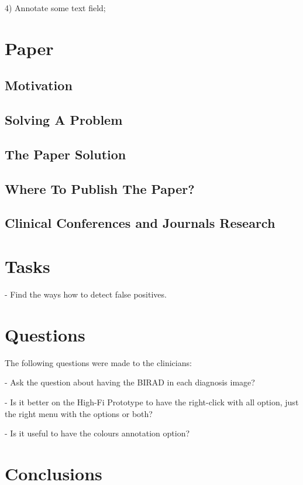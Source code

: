 4) Annotate some text field;

\section{Paper}

\subsection{Motivation}

\subsection{Solving A Problem}

\subsection{The Paper Solution}

\subsection{Where To Publish The Paper?}

\subsection{Clinical Conferences and Journals Research}

\section{Tasks}

- Find the ways how to detect false positives.

\section{Questions}

The following questions were made to the clinicians:

- Ask the question about having the BIRAD in each diagnosis image?

- Is it better on the High-Fi Prototype to have the right-click with all option, just the right menu with the options or both?

- Is it useful to have the colours annotation option?

\clearpage

\section{Conclusions}

